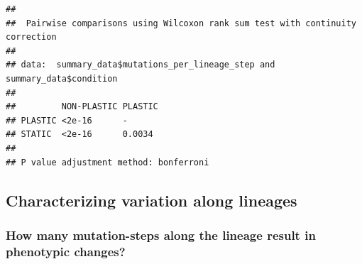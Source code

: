 \documentclass[]{book}
\newenvironment{Shaded}{\begin{snugshade}}{\end{snugshade}}
\newcommand{\DataTypeTok}[1]{\textcolor[rgb]{0.13,0.29,0.53}{#1}}
\newcommand{\DecValTok}[1]{\textcolor[rgb]{0.00,0.00,0.81}{#1}}
\newcommand{\FloatTok}[1]{\textcolor[rgb]{0.00,0.00,0.81}{#1}}
\newcommand{\KeywordTok}[1]{\textcolor[rgb]{0.13,0.29,0.53}{\textbf{#1}}}
\newcommand{\NormalTok}[1]{#1}
\newcommand{\OperatorTok}[1]{\textcolor[rgb]{0.81,0.36,0.00}{\textbf{#1}}}
\newcommand{\StringTok}[1]{\textcolor[rgb]{0.31,0.60,0.02}{#1}}
\begin{document}
\begin{verbatim}
## 
##  Pairwise comparisons using Wilcoxon rank sum test with continuity correction 
## 
## data:  summary_data$mutations_per_lineage_step and summary_data$condition 
## 
##         NON-PLASTIC PLASTIC
## PLASTIC <2e-16      -      
## STATIC  <2e-16      0.0034 
## 
## P value adjustment method: bonferroni
\end{verbatim}

\hypertarget{characterizing-variation-along-lineages}{%
\subsection{Characterizing variation along lineages}\label{characterizing-variation-along-lineages}}

\hypertarget{how-many-mutation-steps-along-the-lineage-result-in-phenotypic-changes}{%
\subsubsection{How many mutation-steps along the lineage result in phenotypic changes?}\label{how-many-mutation-steps-along-the-lineage-result-in-phenotypic-changes}}

\begin{Shaded}
\end{Shaded}
\end{document}

